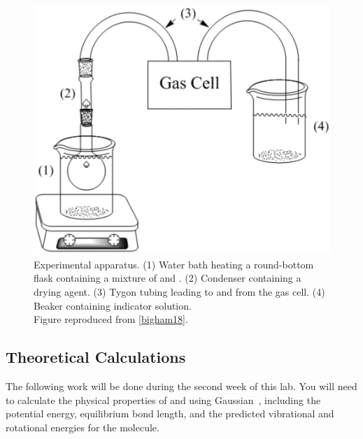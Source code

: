 \begin{figure}[htb]
  \centering
    \includegraphics[width=.9\textwidth]{images/exp_setup_diagram.png}
  \caption{Experimental apparatus. (1) Water bath heating a round-bottom flask containing a mixture of  and . (2) Condenser containing a drying agent. (3) Tygon tubing leading to and from the gas cell. (4) Beaker containing indicator solution. \\
  Figure reproduced from \cref{bigham18}.}
  \label{fig:cell_filling}
\end{figure}



\subsection{Theoretical Calculations} %
\label{sub:theoretical_calculations}

The following work will be done during the second week of this lab. 
You will need to calculate the physical properties of  and  using Gaussian~\autocite{gaussian16}, including the potential energy, equilibrium bond length, and the predicted vibrational and rotational energies for the molecule.

